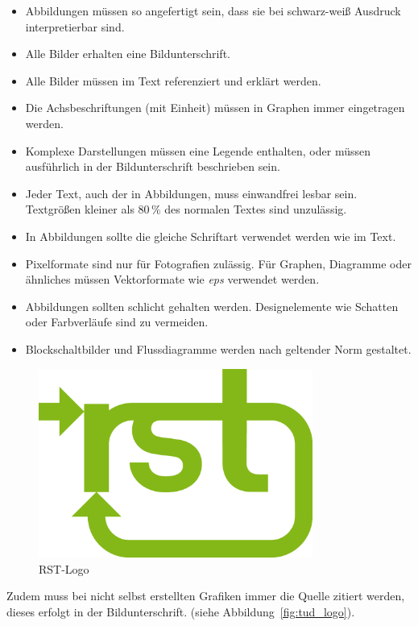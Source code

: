 \begin{itemize}
  \item Abbildungen müssen so angefertigt sein, dass sie bei schwarz-weiß Ausdruck interpretierbar sind.
  \item Alle Bilder erhalten eine Bildunterschrift.
  \item Alle Bilder müssen im Text referenziert und erklärt werden.
  \item Die Achsbeschriftungen (mit Einheit) müssen in Graphen immer eingetragen werden.
  \item Komplexe Darstellungen müssen eine Legende enthalten, oder müssen ausführlich in der Bildunterschrift beschrieben sein.
  \item Jeder Text, auch der in Abbildungen, muss einwandfrei lesbar sein. Textgrößen kleiner als 80\,\% des normalen Textes sind unzulässig.
  \item In Abbildungen sollte die gleiche Schriftart verwendet werden wie im Text.
  \item Pixelformate sind nur für Fotografien zulässig. Für Graphen, Diagramme oder ähnliches müssen Vektorformate wie \textit{eps} verwendet werden.
  \item Abbildungen sollten schlicht gehalten werden. Designelemente wie Schatten oder Farbverläufe sind zu vermeiden.
  \item Blockschaltbilder und Flussdiagramme werden nach geltender Norm gestaltet.
\end{itemize}

\begin{figure}[htbp]
  \centering
  \includegraphics[width=9cm]{images/logos/rst_logo_rgb}
  \caption{RST-Logo}
  \label{fig:rst_logo}
\end{figure}

Zudem muss bei nicht selbst erstellten Grafiken immer die Quelle
zitiert werden, dieses erfolgt in der Bildunterschrift.
(siehe Abbildung~\ref{fig:tud_logo}).

